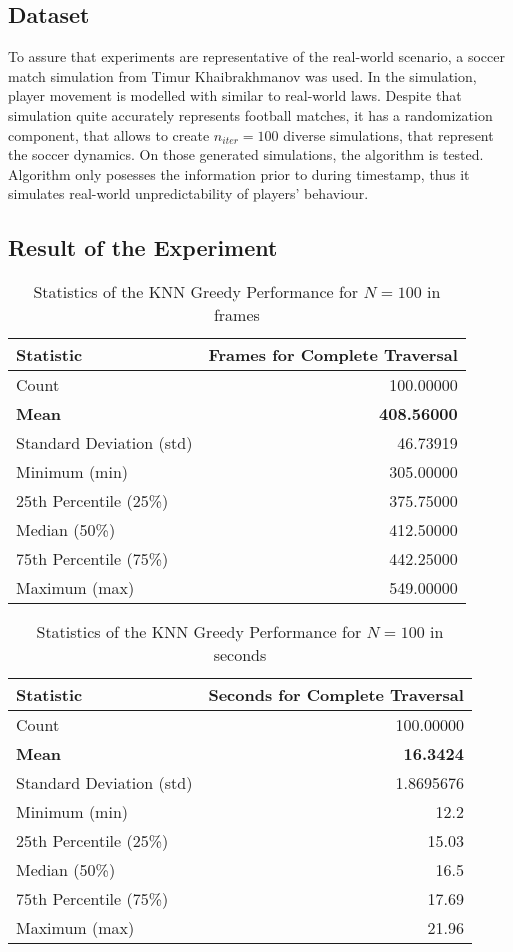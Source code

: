 \subsection{Dataset}
To assure that experiments are representative of the real-world scenario, a soccer match simulation from Timur Khaibrakhmanov was used. In the simulation, player movement is modelled with similar to real-world laws. Despite that simulation quite accurately represents football matches, it has a randomization component, that allows to create $n_{iter}=100$ diverse simulations, that represent the soccer dynamics. On those generated simulations, the algorithm is tested. Algorithm only posesses the information prior to during timestamp, thus it simulates real-world unpredictability of players' behaviour.

\subsection{Result of the Experiment}
\begin{table}[h!]
\centering
\caption{Statistics of the KNN Greedy Performance for $N=100$ in frames}
\begin{tabular}{lr}
\toprule
Statistic & Frames for Complete Traversal \\
\midrule
Count     & 100.00000 \\
\textbf{Mean}      & \textbf{408.56000} \\
Standard Deviation (std) & 46.73919 \\
Minimum (min)  & 305.00000 \\
25th Percentile (25\%) & 375.75000 \\
Median (50\%)  & 412.50000 \\
75th Percentile (75\%) & 442.25000 \\
Maximum (max)  & 549.00000 \\
\bottomrule
\end{tabular}
\label{table:algorithm_stats}
\end{table}



\begin{table}[h!]
\centering
\caption{Statistics of the KNN Greedy Performance for $N=100$ in seconds}
\begin{tabular}{lr}
\toprule
Statistic & Seconds for Complete Traversal \\
\midrule
Count     & 100.00000 \\
\textbf{Mean}      & \textbf{16.3424} \\
Standard Deviation (std) & 1.8695676\\
Minimum (min)  & 12.2 \\
25th Percentile (25\%) & 15.03 \\
Median (50\%)  & 16.5 \\
75th Percentile (75\%) & 17.69 \\
Maximum (max)  & 21.96 \\
\bottomrule
\end{tabular}
\label{table:algorithm_stats}
\end{table}



